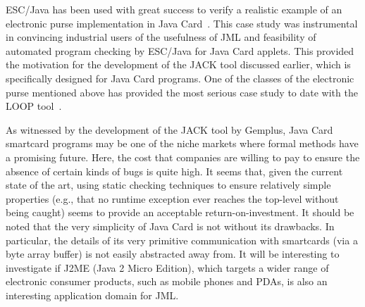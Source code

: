 ESC/Java has been used with great success to verify a realistic
example of an electronic purse implementation in Java
Card~\cite{CatanoHuisman02}. This case study was instrumental in
convincing industrial users of the usefulness of JML and feasibility
of automated program checking by ESC/Java for Java Card applets.  This
provided the motivation for the development of the JACK tool discussed
earlier, which is specifically designed for Java Card programs.  One
of the classes of the electronic purse mentioned above has provided
the most serious case study to date with the LOOP
tool~\cite{BreunesseBJ02}.

As witnessed by the development of the JACK tool by Gemplus, Java Card
smartcard programs may be one of the niche markets where formal
methods have a promising future. Here, the cost that companies are
willing to pay to ensure the absence of certain kinds of bugs is quite
high.  It seems that, given the current state of the art, using static
checking techniques to ensure relatively simple properties (e.g., that
no runtime exception ever reaches the top-level without being caught)
seems to provide an acceptable return-on-investment.  It should be
noted that the very simplicity of Java Card is not without its
drawbacks.  In particular, the details of its very primitive
communication with smartcards (via a byte array buffer) is not easily
abstracted away from.  It will be interesting to investigate if J2ME (Java 2
Micro Edition), which targets a wider range of electronic consumer
products, such as mobile phones and PDAs, is also an interesting
application domain for JML\@.


